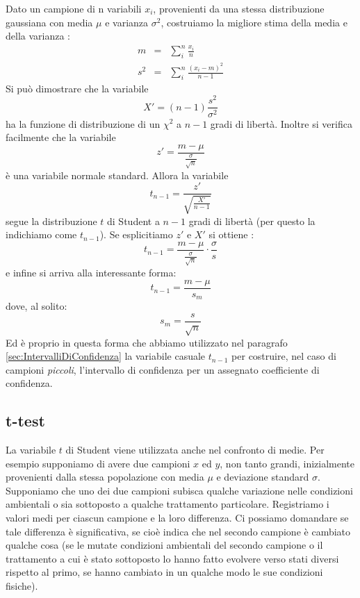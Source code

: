 Dato un campione di n variabili $x_i$, provenienti da una stessa
distribuzione gaussiana con media $\mu$ e varianza $\sigma^2$, costruiamo la
migliore stima della media e della varianza :
\begin{eqnarray*}
m &=& \sum_i^n\frac{x_i}{n}\\
s^2 &=& \sum_i^n\frac{(x_i-m)^2}{n-1}
\end{eqnarray*}
Si pu\`o dimostrare che la variabile
$$
X'=(n-1)\frac{s^2}{\sigma^2}
$$
ha la funzione di distribuzione di un $\chi^2$ a $n-1$ gradi di libert\`a.
Inoltre si verifica facilmente che la variabile
$$
z'=\frac{m-\mu}{\displaystyle \frac{\sigma}{\sqrt{n}}}
$$
\`e una variabile normale standard. Allora la variabile
$$
t_{n-1}=\frac{z'}{\displaystyle \sqrt{\frac{X'}{n-1}}}
$$
segue la distribuzione $t$ di Student a $n-1$ gradi di libert\`a (per questo
la indichiamo come $t_{n-1}$).
Se esplicitiamo $z'$ e $X'$ si ottiene :
$$
t_{n-1} = \frac{m-\mu}{\displaystyle \frac{\sigma}{\sqrt{n}}}
\cdot \frac{\sigma}{s}
$$
e infine si arriva alla interessante forma:
$$t_{n-1}=\frac{m-\mu}{s_m}$$
dove, al solito:
$$
s_m=\frac{s}{\sqrt{n}}
$$
Ed \`e proprio in questa forma che abbiamo utilizzato nel paragrafo
{\ref{sec:IntervalliDiConfidenza}} la variabile casuale $t_{n-1}$
per costruire,  nel caso di campioni {\itshape piccoli}, l'intervallo di
confidenza per un assegnato coefficiente di confidenza.


\subsection{t-test}

La variabile $t$ di Student viene utilizzata anche nel confronto
di medie. Per esempio supponiamo di avere due campioni $x$ ed $y$, non tanto
grandi, inizialmente provenienti dalla stessa popolazione
con media $\mu$ e deviazione standard $\sigma$.
Supponiamo che uno dei due campioni subisca
qualche variazione nelle condizioni ambientali o sia sottoposto
a qualche trattamento particolare. Registriamo i valori medi
 per ciascun campione e la loro differenza. Ci possiamo domandare se tale
differenza \`e significativa, se cio\`e indica che nel secondo
campione \`e cambiato qualche cosa (se le mutate condizioni ambientali del
secondo campione o il trattamento a cui \`e stato sottoposto  lo hanno
fatto evolvere verso stati diversi rispetto al primo, se hanno cambiato
in un qualche modo le sue condizioni fisiche).

